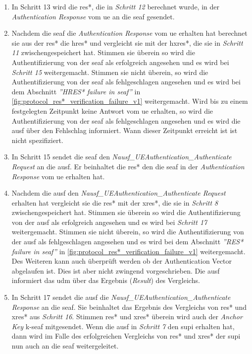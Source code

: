 \begin{enumerate}
\item In Schritt 13 wird die \gls{res*}, die in \textit{Schritt 12} berechnet wurde, in der \textit{Authentication Response} vom \gls{ue} an die \gls{seaf} gesendet.

\item Nachdem die \gls{seaf} die \textit{Authentication Response} vom \gls{ue} erhalten hat berechnet sie aus der \gls{res*} die \gls{hres*} und vergleicht sie mit der \gls{hxres*}, die sie in \textit{Schritt 11} zwischengespeichert hat.
Stimmen sie überein so wird die Authentifizierung von der \gls{seaf} als erfolgreich angesehen und es wird bei \textit{Schritt 15} weitergemacht.
Stimmen sie nicht überein, so wird die Authentifizierung von der \gls{seaf} als fehlgeschlagen angesehen und es wird bei dem Abschnitt \textit{''HRES* failure in \gls{seaf}''} in \cref{fig:protocol_res*_verification_failure_v1} weitergemacht.
Wird bis zu einem festgelegten Zeitpunkt keine Antwort vom \gls{ue} erhalten, so wird die Authentifizierung von der \gls{seaf} als fehlgeschlagen angesehen und es wird die \gls{ausf} über den Fehlschlag informiert.
Wann dieser Zeitpunkt erreicht ist ist nicht spezifiziert.

\item In Schritt 15 sendet die \gls{seaf} den \textit{Nausf\_UEAuthentication\_Authenticate Request} an die \gls{ausf}.
Er beinhaltet die \gls{res*} den die \gls{seaf} in der \textit{Authentication Response} vom \gls{ue} erhalten hat.

\item Nachdem die \gls{ausf} den \textit{Nausf\_UEAuthentication\_Authenticate Request} erhalten hat vergleicht sie die \gls{res*} mit der \gls{xres*}, die sie in \textit{Schritt 8} zwischengespeichert hat.
Stimmen sie überein so wird die Authentifizierung von der \gls{ausf} als erfolgreich angesehen und es wird bei \textit{Schritt 17} weitergemacht.
Stimmen sie nicht überein, so wird die Authentifizierung von der \gls{ausf} als fehlgeschlagen angesehen und es wird bei dem Abschnitt \textit{''RES* failure in \gls{seaf}''} in \cref{fig:protocol_res*_verification_failure_v1} weitergemacht.
Des Weiteren kann auch überprüft werden ob der Authentication Vector abgelaufen ist.
Dies ist aber nicht zwingend vorgeschrieben.
Die \gls{ausf} informiert das \gls{udm} über das Ergebnis (\textit{Result}) des Vergleichs.

\item In Schritt 17 sendet die \gls{ausf} die \textit{Nausf\_UEAuthentication\_Authenticate Response} an die \gls{seaf}.
Sie beinhaltet das Ergebnis des Vergleichs von \gls{res*} und \gls{xres*} aus \textit{Schritt 16}.
Stimmen \gls{res*} und \gls{xres*} überein wird auch der \textit{Anchor Key} \gls{k-seaf} mitgesendet.
Wenn die \gls{ausf} in \textit{Schritt 7} den \gls{supi} erhalten hat, dann wird im Falle des erfolgreichen Vergleichs von \gls{res*} und \gls{xres*} der \gls{supi} nun auch an die \gls{seaf} weitergeleitet.
\end{enumerate}



